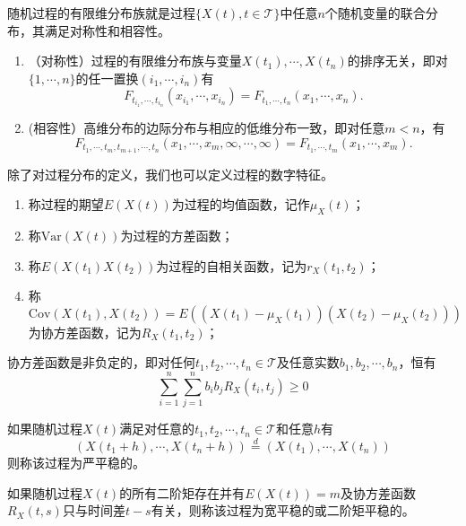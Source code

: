 随机过程的有限维分布族就是过程$\{X(t),t\in\mathcal{T}\}$中任意$n$个随机变量的联合分布，其满足对称性和相容性。
\begin{property}
    \begin{enumerate}
        \item （对称性）过程的有限维分布族与变量$X(t_1),\cdots,X(t_n)$的排序无关，即对$\{1,\cdots,n\}$的任一置换$(i_1,\cdots,i_n)$有
              $$
                  F_{t_{i_1},\cdots,t_{i_n}}(x_{i_1},\cdots,x_{i_n})  = F_{t_1,\cdots,t_n}(x_1,\cdots,x_n).
              $$
        \item (相容性）高维分布的边际分布与相应的低维分布一致，即对任意$m< n$，有
              $$
                  F_{t_1,\cdots,t_{m},t_{m+1},\cdots,t_{n}}(x_1,\cdots,x_m,\infty,\cdots,\infty) = F_{t_1,\cdots,t_m}(x_1,\cdots,x_m).
              $$
    \end{enumerate}
\end{property}
除了对过程分布的定义，我们也可以定义过程的数字特征。
\begin{definition}
    \begin{enumerate}
        \item 称过程的期望$E(X(t))$为过程的均值函数，记作$\mu_{X}(t)$；
        \item 称$\text{Var}(X(t))$为过程的方差函数；
        \item 称$E(X(t_1)X(t_2))$为过程的自相关函数，记为$r_{X}(t_1,t_2)$；
        \item 称$\text{Cov}(X(t_1),X(t_2)) = E((X(t_1)-\mu_{X}(t_1))(X(t_2)-\mu_{X}(t_2)))$为协方差函数，记为$R_{X}(t_1,t_2)$；
    \end{enumerate}
\end{definition}
\begin{theorem}
    协方差函数是非负定的，即对任何$t_1,t_2,\cdots,t_n \in \mathcal{T}$及任意实数$b_1,b_2,\cdots,b_n$，恒有
    $$
        \sum_{i=1}^n \sum_{j=1}^n b_ib_j R_{X}(t_i,t_j) \geq 0
    $$
\end{theorem}

\begin{definition}
    如果随机过程$X(t)$满足对任意的$t_1,t_2,\cdots,t_n\in \mathcal{T}$和任意$h$有
    $$
        (X(t_1+h), \cdots,X(t_n+h)) \overset{d}{=} (X(t_1),\cdots,X(t_n))
    $$
    则称该过程为严平稳的。
\end{definition}
\begin{definition}
    如果随机过程$X(t)$的所有二阶矩存在并有$E(X(t))=m$及协方差函数$R_X(t,s)$只与时间差$t-s$有关，则称该过程为宽平稳的或二阶矩平稳的。
\end{definition}

